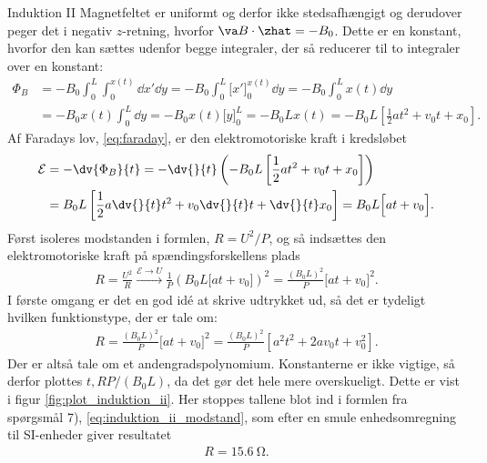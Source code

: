 \begin{opgave}{Induktion II}
    \opg Magnetfeltet er uniformt og derfor ikke stedsafhængigt og derudover peger det i negativ $z$-retning, hvorfor $\va B \cdot \zhat = -B_0$. Dette er en konstant, hvorfor den kan sættes udenfor begge integraler, der så reducerer til to integraler over en konstant:
    \begin{align}
        \Phi_B &= -B_0\int_0^L \int_0^{x(t)} \dd{x'}\dd{y} = -B_0 \int_0^L \Big[x'\Big]_0^{x(t)} \dd{y} = -B_0 \int_0^L x(t) \dd{y} \nonumber \\
        &= -B_0x(t) \int_0^L \dd{y} = -B_0x(t) \Big[y\Big]_0^L = -B_0Lx(t) = -B_0L\left[\frac{1}{2}at^2 + v_0t + x_0\right].
    \end{align}
    \opg Af Faradays lov, \eqref{eq:faraday}, er den elektromotoriske kraft i kredsløbet
    \begin{align}
        \mathcal{E} &= -\dv{\Phi_B}{t} = -\dv{}{t}\left(-B_0L\left[\frac{1}{2}at^2 + v_0t + x_0\right]\right) \nonumber \\
        &= B_0L\left[\frac{1}{2}a\dv{}{t}t^2 + v_0\dv{}{t}t + \dv{}{t}x_0\right] = B_0L\Big[at + v_0\Big].
    \end{align}
    \opg Først isoleres modstanden i formlen, $R = U^2/P$, og så indsættes den elektromotoriske kraft på spændingsforskellens plads
    \begin{align}
        R = \frac{U^2}{R} \xrightarrow{\mathcal{E} \rightarrow U} \frac{1}{P}\left(B_0L\Big[at + v_0\Big]\right)^2 = \frac{(B_0L)^2}{P}\Big[at + v_0\Big]^2.
    \end{align}
    \opg I første omgang er det en god idé at skrive udtrykket ud, så det er tydeligt hvilken funktionstype, der er tale om:
    \begin{align}
        R = \frac{(B_0L)^2}{P}\Big[at + v_0\Big]^2 = \frac{(B_0L)^2}{P}\left[a^2t^2 + 2av_0t + v_0^2\right].
    \end{align}
    Der er altså tale om et andengradspolynomium. Konstanterne er ikke vigtige, så derfor plottes $t,RP/(B_0L)$, da det gør det hele mere overskueligt. Dette er vist i figur \ref{fig:plot_induktion_ii}.
    \opg Her stoppes tallene blot ind i formlen fra spørgsmål 7), \eqref{eq:induktion_ii_modstand}, som efter en smule enhedsomregning til SI-enheder giver resultatet
    \begin{align}
        R = \SI{15,6}{\ohm}.
    \end{align}
\end{opgave}

